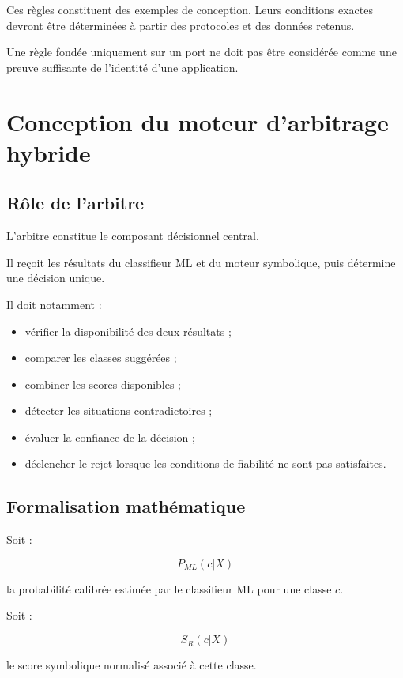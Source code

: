 Ces règles constituent des exemples de conception.
Leurs conditions exactes devront être déterminées
à partir des protocoles et des données retenus.

Une règle fondée uniquement sur un port ne doit pas
être considérée comme une preuve suffisante de l'identité
d'une application.

\section{Conception du moteur d'arbitrage hybride}

\subsection{Rôle de l'arbitre}

L'arbitre constitue le composant décisionnel central.

Il reçoit les résultats du classifieur ML et du moteur
symbolique, puis détermine une décision unique.

Il doit notamment :

\begin{itemize}
    \item vérifier la disponibilité des deux résultats ;
    \item comparer les classes suggérées ;
    \item combiner les scores disponibles ;
    \item détecter les situations contradictoires ;
    \item évaluer la confiance de la décision ;
    \item déclencher le rejet lorsque les conditions
    de fiabilité ne sont pas satisfaites.
\end{itemize}

\subsection{Formalisation mathématique}

Soit :

\[
P_{ML}(c|X)
\]

la probabilité calibrée estimée par le classifieur ML
pour une classe $c$.

Soit :

\[
S_R(c|X)
\]

le score symbolique normalisé associé à cette classe.

